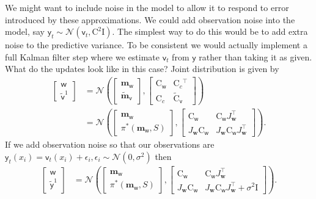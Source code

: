 \documentclass{article}
\newcommand{\vv}[1]{\boldsymbol{#1}}
\newcommand{\mm}[1]{\mathrm{#1}}
\newcommand{\rv}[1]{\mathsf{#1}}
\newcommand{\vrv}[1]{\vv{\rv{#1}}}
\newcommand{\dist}[1]{\mathcal{#1}}
\newcommand{\set}[1]{#1}
\newcommand{\latwt}{\vrv{w}}
\newcommand{\latwtst}{\vv{w}}
\begin{document}
We might want to include noise in the model to allow it to respond to error introduced by these approximations.
We could add observation noise into the model, say \(\rv{y}_t\sim\dist{N}(\rv{v}_t, \mm{C}^2\mm{I}).\)
The simplest way to do this would be to add extra noise to the predictive variance.
To be consistent we would actually implement a full Kalman filter step where we estimate \(\rv{v}_t\) from \(\rv{y}\) rather than taking it as given.
What do the updates look like in this case?
Joint distribution is given by 
\begin{align*}
\left[\begin{array}{c}
    \latwt\\ \tilde{\vrv{v}}^1
\end{array}\right]
&=\dist{N}\left(
    \left[\begin{array}{c}
        \vv{m}_{\latwt}\\
        \tilde{\vv{m}}_{\vrv{v}}
    \end{array}\right],
    \left[\begin{array}{cc}
        \mm{C}_{\latwt} & \mm{C}_{c}{}^\top\\
        \mm{C}_{c}& \tilde{\mm{C}}_{\vrv{v}}
    \end{array}\right]
\right)\\
&=\dist{N}\left(
    \left[\begin{array}{c}
        \vv{m}_{\latwt}\\
        \pi^*(\vv{m}_{\latwt},\set{S})
    \end{array}\right],
    \left[\begin{array}{cc}
        \mm{C}_{\latwt} & 
          \mm{C}_{\latwt} J_{\latwtst}^\top\\
        J_{\latwtst}\mm{C}_{\latwt}&   
          J_{\latwtst}\mm{C}_{\latwt}J_{\latwtst}^{\top}
    \end{array}\right]
\right).
\end{align*}
If we add observation noise so that our observations are \(\rv{y}_{t}(x_i)=\rv{v}_{t}(x_i)+\epsilon_i,\epsilon_i\sim\dist{N}(0,\sigma^2)\) then
\begin{align*}
\left[\begin{array}{c}
    \latwt\\ \tilde{\vrv{y}}^1
\end{array}\right]
&=\dist{N}\left(
    \left[\begin{array}{c}
        \vv{m}_{\latwt}\\
        \pi^*(\vv{m}_{\latwt},\set{S})
    \end{array}\right],
    \left[\begin{array}{cc}
        \mm{C}_{\latwt} & 
          \mm{C}_{\latwt}J_{\latwtst}^\top\\
        J_{\latwtst}\mm{C}_{\latwt}&   
          J_{\latwtst}\mm{C}_{\latwt}J_{\latwtst}^{\top} + \sigma^2\mm{I}
    \end{array}\right]
\right).
\end{align*}
\end{document}
